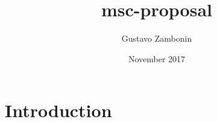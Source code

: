 \documentclass{article}
\title{msc-proposal}
\author{Gustavo Zambonin}
\date{November 2017}
\begin{document}
\maketitle

\section{Introduction}
\end{document}
